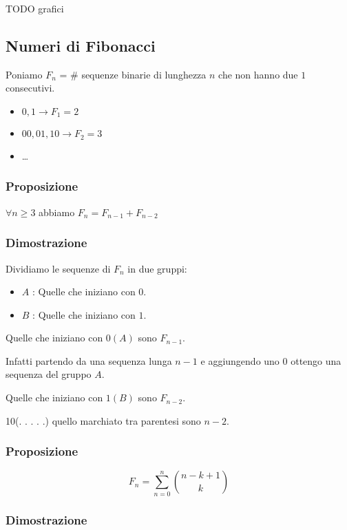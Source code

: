 \documentclass[11pt]{article}
\begin{document}
			TODO grafici

			\subsection{Numeri di Fibonacci}

			Poniamo $F_n$ = \# sequenze binarie di lunghezza $n$ che non hanno
			due $1$ consecutivi.

			\begin{itemize}
				\item $0,1 \to F_1 = 2$
				\item $00, 01, 10 \to  F_2 = 3$
				\item \ldots 
			\end{itemize}

			\subsubsection{Proposizione}

			$\forall n \geq 3$ abbiamo $F_n = F_{n-1} + F_{n-2}$

			\subsubsection{Dimostrazione}

			Dividiamo le sequenze di $F_n$ in due gruppi:
			\begin{itemize}
				\item $A$ : Quelle che iniziano con $0$.
				\item $B$ : Quelle che iniziano con $1$. 
			\end{itemize}
			Quelle che iniziano con $0 (A)$ sono $F_{n-1}$.

			Infatti partendo da una sequenza lunga $n-1$ e aggiungendo uno $0$
			ottengo una sequenza del gruppo $A$.

			Quelle che iniziano con $1 (B)$ sono $F_{n-2}$.

			10(. . . . .) quello marchiato tra parentesi sono $n-2$.
			
			\subsubsection{Proposizione}

			\[
				F_n = \sum_{n=0}^{n}
				\binom{n-k+1}{k}
			\]

			\subsubsection{Dimostrazione}
\end{document}
